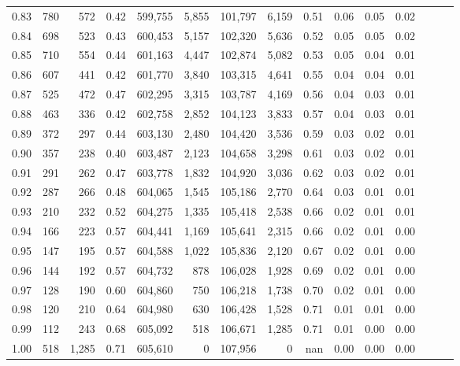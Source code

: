 \begin{tabular}{rrrrrrrrrrrrrrr}
0.83 &     780 &    572 &  0.42 &  599,755 &    5,855 &  101,797 &    6,159 &  0.51 &  0.06 &  0.05 &      0.02 \\
0.84 &     698 &    523 &  0.43 &  600,453 &    5,157 &  102,320 &    5,636 &  0.52 &  0.05 &  0.05 &      0.02 \\
0.85 &     710 &    554 &  0.44 &  601,163 &    4,447 &  102,874 &    5,082 &  0.53 &  0.05 &  0.04 &      0.01 \\
0.86 &     607 &    441 &  0.42 &  601,770 &    3,840 &  103,315 &    4,641 &  0.55 &  0.04 &  0.04 &      0.01 \\
0.87 &     525 &    472 &  0.47 &  602,295 &    3,315 &  103,787 &    4,169 &  0.56 &  0.04 &  0.03 &      0.01 \\
0.88 &     463 &    336 &  0.42 &  602,758 &    2,852 &  104,123 &    3,833 &  0.57 &  0.04 &  0.03 &      0.01 \\
0.89 &     372 &    297 &  0.44 &  603,130 &    2,480 &  104,420 &    3,536 &  0.59 &  0.03 &  0.02 &      0.01 \\
0.90 &     357 &    238 &  0.40 &  603,487 &    2,123 &  104,658 &    3,298 &  0.61 &  0.03 &  0.02 &      0.01 \\
0.91 &     291 &    262 &  0.47 &  603,778 &    1,832 &  104,920 &    3,036 &  0.62 &  0.03 &  0.02 &      0.01 \\
0.92 &     287 &    266 &  0.48 &  604,065 &    1,545 &  105,186 &    2,770 &  0.64 &  0.03 &  0.01 &      0.01 \\
0.93 &     210 &    232 &  0.52 &  604,275 &    1,335 &  105,418 &    2,538 &  0.66 &  0.02 &  0.01 &      0.01 \\
0.94 &     166 &    223 &  0.57 &  604,441 &    1,169 &  105,641 &    2,315 &  0.66 &  0.02 &  0.01 &      0.00 \\
0.95 &     147 &    195 &  0.57 &  604,588 &    1,022 &  105,836 &    2,120 &  0.67 &  0.02 &  0.01 &      0.00 \\
0.96 &     144 &    192 &  0.57 &  604,732 &      878 &  106,028 &    1,928 &  0.69 &  0.02 &  0.01 &      0.00 \\
0.97 &     128 &    190 &  0.60 &  604,860 &      750 &  106,218 &    1,738 &  0.70 &  0.02 &  0.01 &      0.00 \\
0.98 &     120 &    210 &  0.64 &  604,980 &      630 &  106,428 &    1,528 &  0.71 &  0.01 &  0.01 &      0.00 \\
0.99 &     112 &    243 &  0.68 &  605,092 &      518 &  106,671 &    1,285 &  0.71 &  0.01 &  0.00 &      0.00 \\
1.00 &     518 &  1,285 &  0.71 &  605,610 &        0 &  107,956 &        0 &   nan &  0.00 &  0.00 &      0.00 \\
\bottomrule
\end{tabular}
